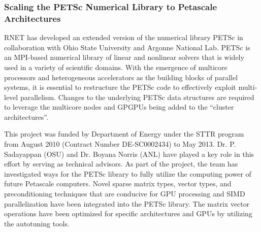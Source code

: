

\subsubsection{Scaling the PETSc Numerical Library to Petascale Architectures}

RNET has developed an extended version of the numerical library PETSc \cite{Lowell1} in
collaboration with Ohio State University and Argonne National Lab. PETSc is an MPI-based numerical library of
linear and nonlinear solvers that is widely used in a variety of scientific domains. With the
emergence of multicore processors and heterogeneous accelerators as the building blocks of
parallel systems, it is essential to restructure the PETSc code to effectively exploit multi-level
parallelism. Changes to the underlying PETSc data structures are required to leverage the multicore
nodes and GPGPUs being added to the ``cluster architectures''.

This project was funded by Department of Energy under the STTR program from August 2010 (Contract Number DE-SC0002434) 
to May 2013. Dr. P. Sadayappan (OSU) and Dr. Boyana Norris (ANL) have played a key role in this effort by serving as 
technical advisors. As part of the project, the team has investigated ways for the PETSc library to fully utilize the 
computing power of future Petascale computers. Novel sparse matrix types,  vector types, and preconditioning techniques 
that are conducive for GPU processing and SIMD parallelization have been integrated into the PETSc library. The matrix 
vector operations have been optimized for specific architectures and GPUs by utilizing the autotuning tools.


